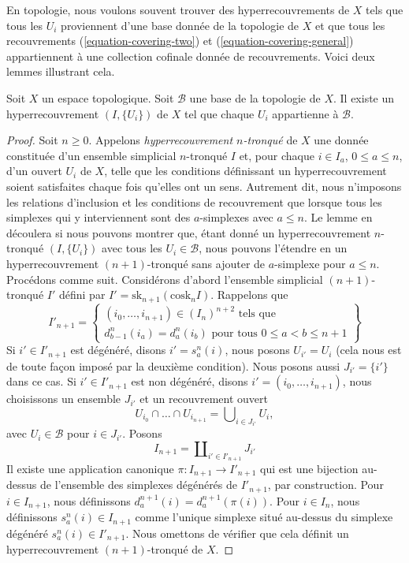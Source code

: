 \noindent
En topologie, nous voulons souvent trouver des hyperrecouvrements de $X$ tels
que tous les $U_i$ proviennent d'une base donnée de la topologie
de $X$ et que tous les recouvrements
(\ref{equation-covering-two}) et (\ref{equation-covering-general})
appartiennent à une collection cofinale donnée de recouvrements.
Voici deux lemmes illustrant cela.

\begin{lemma}
\label{lemma-basis-hypercovering}
Soit $X$ un espace topologique.
Soit $\mathcal{B}$ une base de la topologie de $X$.
Il existe un hyperrecouvrement $(I, \{U_i\})$ de $X$
tel que chaque $U_i$ appartienne à $\mathcal{B}$.
\end{lemma}

\begin{proof}
Soit $n \geq 0$.
Appelons {\it hyperrecouvrement $n$-tronqué} de $X$ une donnée
constituée d'un ensemble simplicial $n$-tronqué $I$ et, pour chaque
$i \in I_a$, $0 \leq a \leq n$, d'un ouvert $U_i$ de $X$, telle que
les conditions définissant un hyperrecouvrement soient satisfaites chaque fois qu'elles ont un sens.
Autrement dit, nous n'imposons les relations d'inclusion et les conditions de
recouvrement que lorsque tous les simplexes qui y interviennent
sont des $a$-simplexes avec $a \leq n$. Le lemme en découlera si nous pouvons montrer
que, étant donné un hyperrecouvrement $n$-tronqué $(I, \{U_i\})$ avec
tous les $U_i \in \mathcal{B}$, nous pouvons l'étendre en un hyperrecouvrement
$(n + 1)$-tronqué sans ajouter de $a$-simplexe pour $a \leq n$.
Procédons comme suit. Considérons d'abord l'ensemble simplicial
$(n + 1)$-tronqué $I'$ défini par
$I' = \text{sk}_{n + 1}(\text{cosk}_n I)$.
Rappelons que
$$
I'_{n + 1} =
\left\{
\begin{matrix}
(i_0, \ldots, i_{n + 1}) \in (I_n)^{n + 2} \text{ tels que}\\
d^n_{b - 1}(i_a) = d^n_a(i_b) \text{ pour tous }0\leq a < b\leq n + 1
\end{matrix}
\right\}
$$
Si $i' \in I'_{n + 1}$ est dégénéré, disons $i' = s^n_a(i)$, nous posons
$U_{i'} = U_i$ (cela nous est de toute façon imposé par la deuxième condition).
Nous posons aussi $J_{i'} = \{i'\}$ dans ce cas.
Si $i' \in I'_{n + 1}$ est non dégénéré, disons
$i' = (i_0, \ldots, i_{n + 1})$, nous choisissons un ensemble
$J_{i'}$ et un recouvrement ouvert
\begin{equation}
\label{equation-choose-covering}
U_{i_0} \cap \ldots \cap U_{i_{n + 1}} =
\bigcup\nolimits_{i \in J_{i'}} U_i,
\end{equation}
avec $U_i \in \mathcal{B}$ pour $i \in J_{i'}$.
Posons
$$
I_{n + 1} = \coprod\nolimits_{i' \in I'_{n + 1}} J_{i'}
$$
Il existe une application canonique $\pi : I_{n + 1} \to I'_{n + 1}$ qui est
une bijection au-dessus de l'ensemble des simplexes dégénérés de $I'_{n + 1}$, par
construction.
Pour $i \in I_{n + 1}$, nous définissons $d^{n + 1}_a(i) = d^{n + 1}_a(\pi(i))$.
Pour $i \in I_n$, nous définissons $s^n_a(i) \in I_{n + 1}$ comme l'unique
simplexe situé au-dessus du simplexe dégénéré $s^n_a(i) \in I'_{n + 1}$.
Nous omettons de vérifier que cela définit un hyperrecouvrement
$(n + 1)$-tronqué de $X$.
\end{proof}

